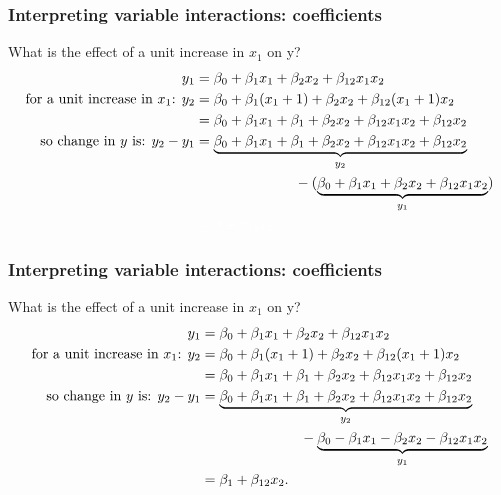 \documentclass[aspectratio=169]{beamer}
\theoremstyle{principle}
\begin{document}
\begin{frame}
\frametitle{Interpreting variable interactions: coefficients}

What is the effect of a unit increase in $x_1$ on y?
\begin{align*}
y_1 &= \beta_0 + \beta_1x_1 + \beta_2x_2 + \beta_{12}x_1x_2\\
\mbox{for a unit increase in $x_1$: } y_2 &= \beta_0 + \beta_1(x_1 + 1) + \beta_2x_2 + \beta_{12}(x_1 + 1)x_2\\
&= \beta_0 + \beta_1x_1 + \beta_1 + \beta_2x_2 + \beta_{12}x_1x_2 + \beta_{12}x_2\\
\mbox{so change in $y$ is: }y_2 - y_1 &= \underbrace{\beta_0 + \beta_1x_1 + \beta_1 + \beta_2x_2 + \beta_{12}x_1x_2 + \beta_{12}x_2}_{y_2}\\
&\hspace{25mm} - (\underbrace{\beta_0 + \beta_1x_1 + \beta_2x_2 + \beta_{12}x_1x_2}_{y_1})\\
\color{white}&\color{white}= \beta + \beta_{12}x_2.
\end{align*}

\end{frame}

\begin{frame}
\frametitle{Interpreting variable interactions: coefficients}

What is the effect of a unit increase in $x_1$ on y?
\begin{align*}
y_1 &= \beta_0 + \beta_1x_1 + \beta_2x_2 + \beta_{12}x_1x_2\\
\mbox{for a unit increase in $x_1$: } y_2 &= \beta_0 + \beta_1(x_1 + 1) + \beta_2x_2 + \beta_{12}(x_1 + 1)x_2\\
&= \beta_0 + \beta_1x_1 + \beta_1 + \beta_2x_2 + \beta_{12}x_1x_2 + \beta_{12}x_2\\
\mbox{so change in $y$ is: }y_2 - y_1 &= \underbrace{\beta_0 + \beta_1x_1 + \beta_1 + \beta_2x_2 + \beta_{12}x_1x_2 + \beta_{12}x_2}_{y_2}\\
&\hspace{25mm} - \underbrace{\beta_0 - \beta_1x_1 - \beta_2x_2 - \beta_{12}x_1x_2}_{y_1}\\
&= \beta_1 + \beta_{12}x_2.
\end{align*}

\end{frame}
\end{document}
